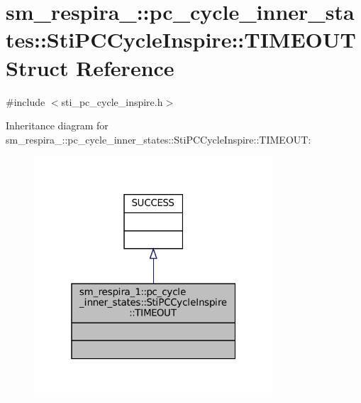 \hypertarget{structsm__respira__1_1_1pc__cycle__inner__states_1_1StiPCCycleInspire_1_1TIMEOUT}{}\section{sm\+\_\+respira\+\_\+:\+:pc\+\_\+cycle\+\_\+inner\+\_\+states\+:\+:Sti\+P\+C\+Cycle\+Inspire\+:\+:T\+I\+M\+E\+O\+UT Struct Reference}
\label{structsm__respira__1_1_1pc__cycle__inner__states_1_1StiPCCycleInspire_1_1TIMEOUT}


{\ttfamily \#include $<$sti\+\_\+pc\+\_\+cycle\+\_\+inspire.\+h$>$}



Inheritance diagram for sm\+\_\+respira\+\_\+:\+:pc\+\_\+cycle\+\_\+inner\+\_\+states\+:\+:Sti\+P\+C\+Cycle\+Inspire\+:\+:T\+I\+M\+E\+O\+UT\+:
\nopagebreak
\begin{figure}[H]
\begin{center}
\leavevmode
\includegraphics[width=253pt]{structsm__respira__1_1_1pc__cycle__inner__states_1_1StiPCCycleInspire_1_1TIMEOUT__inherit__graph}
\end{center}
\end{figure}


